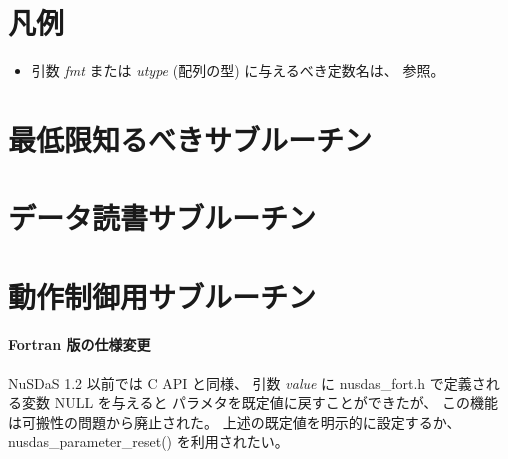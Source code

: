 \label{chap:fapi}

\section{凡例}

\newcommand{\Prototype}{\paragraph{書式}}
\newcommand{\ArgName}{引数名}
\newcommand{\ArgType}{引数の型}
\newcommand{\ArrayDim}{配列長}
\newcommand{\ArgRole}{役割}
\newcommand{\AnyType}{任意}
\newcommand{\AnySize}{可変}
\newcommand{\ResultCode}{終了コード}
\newcommand{\FuncDesc}{説明}
\newcommand{\Bug}{バグ}
\newcommand{\APILabel}[1]{\label{fapi:#1}}
\newcommand{\APILink}[2]{{#2(p. \pageref{fapi:#1})}}

\begin{itemize}
 \item
  引数 {\it fmt} または {\it utype} (配列の型) に与えるべき定数名は、
  参照。
\end{itemize}

\clearpage
\section{最低限知るべきサブルーチン}









\clearpage
\section{データ読書サブルーチン}







\clearpage
\section{動作制御用サブルーチン}






 \paragraph{Fortran 版の仕様変更}
 NuSDaS 1.2 以前では C API と同様、
 引数 {\it value} に nusdas\_fort.h で定義される変数 NULL を与えると
 パラメタを既定値に戻すことができたが、
 この機能は可搬性の問題から廃止された。
 上述の既定値を明示的に設定するか、
 nusdas\_parameter\_reset() を利用されたい。


